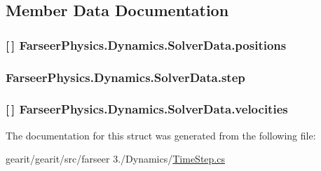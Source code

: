 \subsection{Member Data Documentation}
\hypertarget{struct_farseer_physics_1_1_dynamics_1_1_solver_data_a133bfda7a1f344a88e179c281c94e64a}{
\subsubsection[{positions}]{ \mbox{[}$\,$\mbox{]} Farseer\+Physics.\+Dynamics.\+Solver\+Data.\+positions}}\label{struct_farseer_physics_1_1_dynamics_1_1_solver_data_a133bfda7a1f344a88e179c281c94e64a}
\hypertarget{struct_farseer_physics_1_1_dynamics_1_1_solver_data_a84e7d275dfac7c45dec8920ab616fd17}{
\subsubsection[{step}]{ Farseer\+Physics.\+Dynamics.\+Solver\+Data.\+step}}\label{struct_farseer_physics_1_1_dynamics_1_1_solver_data_a84e7d275dfac7c45dec8920ab616fd17}
\hypertarget{struct_farseer_physics_1_1_dynamics_1_1_solver_data_a11963f8bd5646c0479e7c225112a9cce}{
\subsubsection[{velocities}]{ \mbox{[}$\,$\mbox{]} Farseer\+Physics.\+Dynamics.\+Solver\+Data.\+velocities}}\label{struct_farseer_physics_1_1_dynamics_1_1_solver_data_a11963f8bd5646c0479e7c225112a9cce}


The documentation for this struct was generated from the following file\+:\begin{DoxyCompactItemize}
\item 
gearit/gearit/src/farseer 3./\+Dynamics/\hyperlink{_time_step_8cs}{Time\+Step.\+cs}\end{DoxyCompactItemize}
